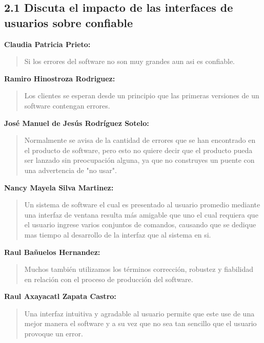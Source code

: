 \subsection*{2.1 Discuta el impacto de las interfaces de usuarios sobre confiable}

\textbf{Claudia Patricia Prieto:}
\begin{quote}
Si los errores del software no son muy grandes aun asi es confiable.
\end{quote}

\textbf{Ramiro Hinostroza Rodriguez:}
\begin{quote}
Los clientes se esperan desde un principio que las primeras versiones de un software contengan errores.
\end{quote}

\textbf{José Manuel de Jesús Rodríguez Sotelo:}
\begin{quote}
Normalmente se avisa de la cantidad de errores que se han encontrado en el producto de software, pero esto no quiere decir que el producto pueda ser lanzado sin preocupación alguna, ya que no construyes un puente con una advertencia de "no usar".
\end{quote}

\textbf{Nancy Mayela Silva Martinez:}
\begin{quote}
Un sistema de software el cual es presentado al usuario promedio mediante una interfaz de ventana resulta más amigable que uno el cual requiera que el usuario ingrese varios conjuntos de comandos, causando que se dedique mas tiempo al desarrollo de la interfaz que al sistema en si.
\end{quote}

\textbf{Raul Bañuelos Hernandez:}
\begin{quote}
Muchos también utilizamos los términos corrección, robustez y fiabilidad en relación con el proceso de producción del software.
\end{quote}

\textbf{Raul Axayacatl Zapata Castro:}
\begin{quote}
Una interfaz intuitiva y agradable al usuario permite que este use de una mejor manera el software y a su vez que no sea tan sencillo que el usuario provoque un error.
\end{quote}
